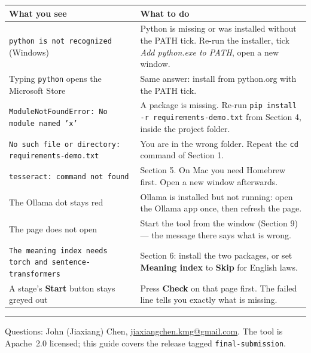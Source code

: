 \documentclass[11pt,a4paper]{article}
\begin{document}
\begin{center}
\begin{tabular}{@{}p{}p{}@{}}
\toprule
\textbf{What you see} & \textbf{What to do} \\
\midrule
\texttt{python is not recognized} (Windows) &
Python is missing or was installed without the PATH tick. Re-run the installer,
tick \emph{Add python.exe to PATH}, open a new window. \\[2pt]
Typing \texttt{python} opens the Microsoft Store &
Same answer: install from python.org with the PATH tick. \\[2pt]
\texttt{ModuleNotFoundError: No module named 'x'} &
A package is missing. Re-run \texttt{pip install -r requirements-demo.txt} from
Section 4, inside the project folder. \\[2pt]
\texttt{No such file or directory: requirements-demo.txt} &
You are in the wrong folder. Repeat the \texttt{cd} command of Section 1. \\[2pt]
\texttt{tesseract: command not found} &
Section 5. On Mac you need Homebrew first. Open a new window afterwards. \\[2pt]
The Ollama dot stays red &
Ollama is installed but not running: open the Ollama app once, then refresh the page. \\[2pt]
The page does not open &
Start the tool from the window (Section 9) --- the message there says what is wrong. \\[2pt]
\texttt{The meaning index needs torch and sentence-transformers} &
Section 6: install the two packages, or set \textbf{Meaning index} to \textbf{Skip} for English laws. \\[2pt]
A stage's \textbf{Start} button stays greyed out &
Press \textbf{Check} on that page first. The failed line tells you exactly what is missing. \\
\bottomrule
\end{tabular}
\end{center}

\vspace{4mm}
\noindent\rule{\textwidth}{0.4pt}

\small
Questions: John (Jiaxiang) Chen, \href{mailto:jiaxiangchen.kmg@gmail.com}{jiaxiangchen.kmg@gmail.com}.
The tool is Apache~2.0 licensed; this guide covers the release tagged \texttt{final-submission}.
\end{document}
